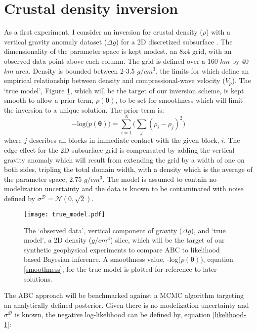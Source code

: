 \section{Crustal density inversion}

As a first experiment, I consider an inversion for crustal density ($\rho$) with a vertical gravity anomaly dataset ($\Delta g$) for a 2D discretized subsurface \citep[p.184-195,378]{blakely1996}. The dimensionality of the parameter space is kept modest, an 8x4 grid, with an observed data point above each column. The grid is defined over a 160 $km$ by 40 $km$ area. Density is bounded between 2-3.5 $g/cm^3$, the limits for which \citet{Brocher2005} define an empirical relationship between density and compressional-wave velocity ($V_p$). The `true model', Figure \ref{true_model}, which will be the target of our inversion scheme, is kept smooth to allow a prior term, $p(\bm{\theta})$, to be set for smoothness which will limit the inversion to a unique solution. The prior term is:
\begin{equation}
-\text{log}\big(p(\bm{\theta})\big) = \sum_{i = 1}^{N} \Big(\sum_{j} (\rho_i - \rho_j)^2\Big)
\label{smoothness}
\end{equation}
where $j$ describes all blocks in immediate contact with the given block, $i$. The edge effect for the 2D subsurface grid is compensated by adding the vertical gravity anomaly which will result from extending the grid by a width of one on both sides, tripling the total domain width, with a density which is the average of the parameter space, 2.75 $g/cm^3$. The model is assumed to contain no modelization uncertainty and the data is known to be contaminated with noise defined by $\sigma^{\mathcal{D}} = \mathcal{N}(0,\sqrt{2})$.
\begin{figure}[H]
	\centering
	\texttt{[image: true\_model.pdf]}
	\caption{The `observed data', vertical component of gravity ($\Delta g$), and `true model', a 2D density ($g/cm^3$) slice, which will be the target of our synthetic geophysical experiments to compare ABC to likelihood based Bayesian inference. A smoothness value, -log($p(\bm{\theta})$), equation \ref{smoothness}, for the true model is plotted for reference to later solutions.}
	\label{true_model}
\end{figure}
The ABC approach will be benchmarked against a MCMC algorithm targeting an analytically defined posterior. Given there is no modelization uncertainty and $\sigma^{\mathcal{D}}$ is known, the negative log-likelihood can be defined by, equation \ref{likelihood-1}:
